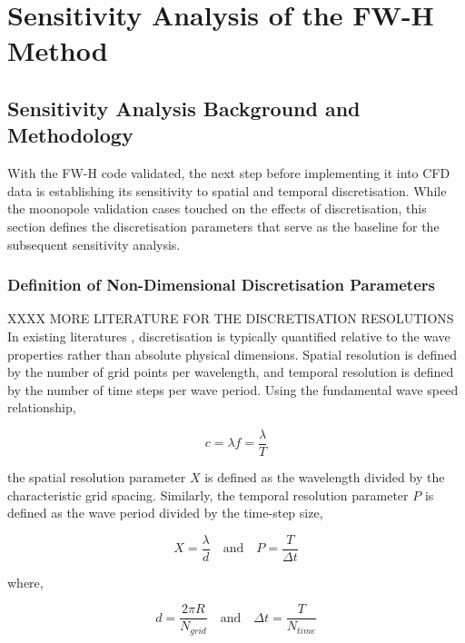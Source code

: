 
\chapter{Sensitivity Analysis of the FW-H Method}\label{ch:sensitivity_analysis}

\section{Sensitivity Analysis Background and Methodology} \label{sec:sensitivity_analysis_method}

With the FW-H code validated, the next step before implementing it into CFD data is establishing its sensitivity to spatial and temporal discretisation. While the moonopole validation cases touched on the effects of discretisation, this section defines the discretisation parameters that serve as the baseline for the subsequent sensitivity analysis.

\subsection{Definition of Non-Dimensional Discretisation Parameters} \label{subsec:PX_definition}
XXXX MORE LITERATURE FOR THE DISCRETISATION RESOLUTIONS \\
In existing literatures \cite{Lewis2024, Dunn2014}, discretisation is typically quantified relative to the wave properties rather than absolute physical dimensions. Spatial resolution is defined by the number of grid points per wavelength, and temporal resolution is defined by the number of time steps per wave period. Using the fundamental wave speed relationship,

\begin{equation}
    c = \lambda f = \frac{\lambda}{T}
    \label{eq:wavespeed}
\end{equation}

the spatial resolution parameter $X$ is defined as the wavelength divided by the characteristic grid spacing. Similarly, the temporal resolution parameter $P$ is defined as the wave period divided by the time-step size,

\begin{equation}
    X =\frac{\lambda}{d}  \quad \text{and} \quad P= \frac{T}{\Delta t} 
    \label{eq:freestream_PX}
\end{equation}

where,

\begin{equation*}
    d = \frac{2\pi R}{N_{grid}} \quad \text{and} \quad \Delta t = \frac{T}{N_{time}}
\end{equation*}

